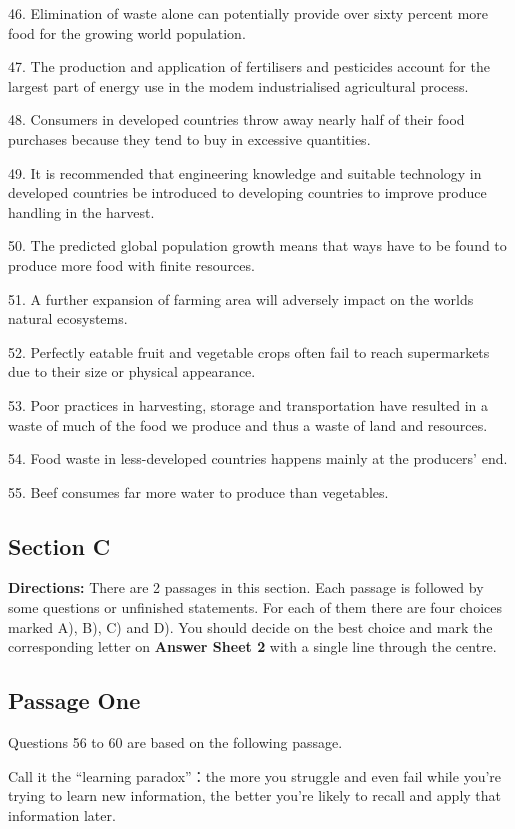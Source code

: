 \documentclass[UTF8,11pt]{ctexart}
\begin{document}
46. Elimination of waste alone can potentially provide over sixty percent more food for the growing world population.


47. The production and application of fertilisers and pesticides account for the largest part of energy use in the modem industrialised agricultural process.


48. Consumers in developed countries throw away nearly half of their food purchases because they tend to buy in excessive quantities.


49. It is recommended that engineering knowledge and suitable technology in developed countries be introduced to developing countries to improve produce handling in the harvest.


50. The predicted global population growth means that ways have to be found to produce more food with finite resources.


51. A further expansion of farming area will adversely impact on the worlds natural ecosystems.


52. Perfectly eatable fruit and vegetable crops often fail to reach supermarkets due to their size or physical appearance.


53. Poor practices in harvesting, storage and transportation have resulted in a waste of much of the food we produce and thus a waste of land and resources.


54. Food waste in less-developed countries happens mainly at the producers’ end.


55. Beef consumes far more water to produce than vegetables.


\subsection*{Section C}


\textbf{Directions:} There are 2 passages in this section. Each passage is followed by some questions or unfinished statements. For each of them there are four choices marked A), B), C) and D). You should decide on the best choice and mark the corresponding letter on\textbf{ Answer Sheet 2} with a single line through the centre.


\subsection*{Passage One}


Questions 56 to 60 are based on the following passage.


Call it the “learning paradox”：the more you struggle and even fail while you’re trying to learn new information, the better you’re likely to recall and apply that information later.
\end{document}
